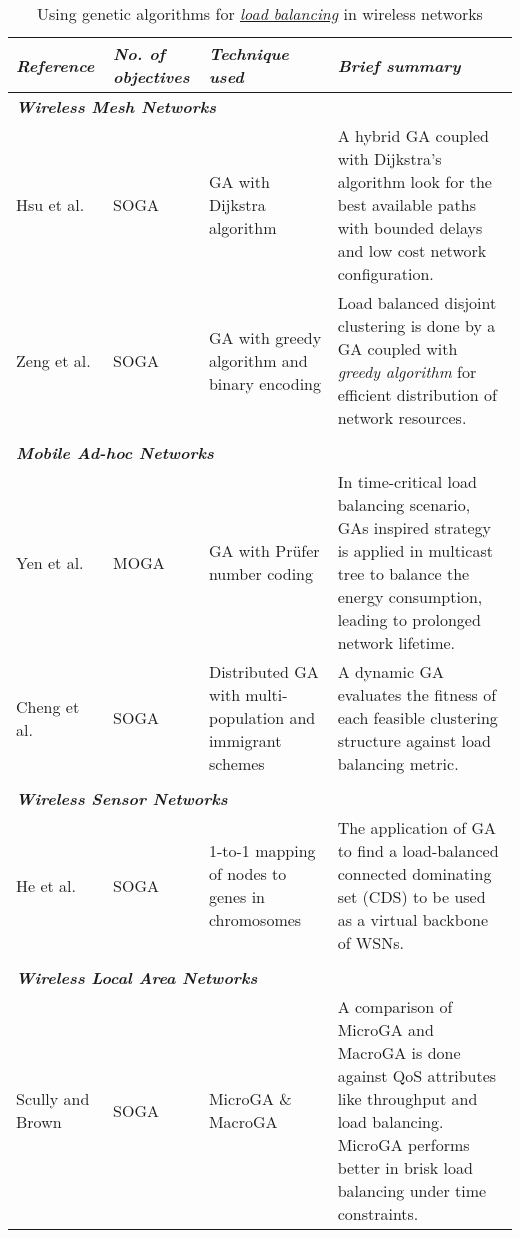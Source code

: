 \documentclass[journal]{IEEEtran}
\begin{document}
\begin{table*}
\caption{Using genetic algorithms for \textit{\underline{load balancing}} in wireless networks}
\centering
\begin{tabular}{p{1.8cm} p{1.5cm} p{4cm} p{9.7cm}}
\toprule
\textbf{\emph{Reference}}  &  \textbf{\emph{No. of \newline objectives}}  &  \textbf{\emph{Technique used}} & \textbf{\emph{Brief summary}} \\
\midrule

\multicolumn{3}{l}{\textbf{\emph{Wireless Mesh Networks}}} \\

Hsu et al. \cite{hsu2008survivable}  & SOGA & GA with Dijkstra algorithm &  A hybrid GA coupled with Dijkstra's algorithm look for the best available paths with bounded delays and low cost network configuration. \\

Zeng et al. \cite{zeng2008load}  &  SOGA & GA with greedy algorithm and binary encoding &  Load balanced disjoint clustering is done by a GA coupled with \textit{greedy algorithm} for efficient distribution of network resources. \\

\\
\multicolumn{3}{l}{\textbf{\emph{Mobile Ad-hoc Networks}}} \\

Yen et al. \cite{yen2008genetic}  &  MOGA  & GA with Pr\"ufer number coding &  In time-critical load balancing scenario, GAs inspired strategy is applied in multicast tree to balance the energy consumption, leading to prolonged network lifetime.\\

Cheng et al. \cite{cheng2013dynamic}  &  SOGA & Distributed GA with multi-population and immigrant schemes &  A dynamic GA evaluates the fitness of each feasible clustering structure against load balancing metric.\\

\\
\multicolumn{3}{l}{\textbf{\emph{Wireless Sensor Networks}}} \\
He et al. \cite{he2012load}  &  SOGA & 1-to-1 mapping of nodes to genes in chromosomes &  The application of GA to find a load-balanced connected dominating set (CDS) to be used as a virtual backbone of WSNs.\\

\\
\multicolumn{3}{l}{\textbf{\emph{Wireless Local Area Networks}}} \\
Scully and Brown \cite{scully2009wireless}   & SOGA & MicroGA \&  MacroGA &  A comparison of MicroGA and MacroGA is done against QoS attributes like throughput and load balancing. MicroGA performs better in brisk load balancing under time constraints. \\

\bottomrule
\end{tabular}
\label{tab:LoadBalancing}
\end{table*}
\end{document}
